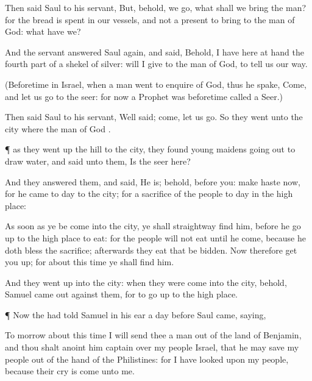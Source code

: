 {Then
said
Saul to his
servant, But, behold,
{} we
go, what shall we
bring the
man? for the
bread is
spent in our
vessels, and
{} not a
present to
bring to the
man of
God: what have we?

And the
servant
answered
Saul
again, and
said, Behold, I
have here at
hand the fourth
part of a
shekel of
silver:
{} will I
give to the
man of
God, to
tell us our
way.

(Beforetime in
Israel, when a
man
went to
enquire of
God, thus he
spake,
Come, and let us
go to the
seer: for
{}
now
{} a
Prophet was
beforetime
called a
Seer.)

Then
said
Saul to his
servant,
Well
said;
come, let us
go. So they
went unto the
city where the
man of
God
{}.


\par }{\PP {}¶
{} as they went
up the
hill to the
city, they
found young
maidens going
out to
draw
water, and
said unto them,
Is the
seer here?

And they
answered them, and
said, He
is; behold,
{}
before you: make
haste now, for he
came to
day to the
city; for
{} a
sacrifice of the
people to
day in the high
place:

As soon as ye be
come into the
city, ye shall
straightway
find him, before he go
up to the high
place to
eat: for the
people will not
eat until he
come, because he doth
bless the
sacrifice;
{}
afterwards they
eat that be
bidden. Now therefore get you
up; for about this
time ye shall
find him.

And they went
up
into the
city:
{} when they were
come into the
city, behold,
Samuel came
out
against them, for to go
up to the high
place.


\par }{\PP {}¶ Now the
{} had
told
Samuel in his
ear
a
day
before
Saul
came,
saying,

To
morrow about this
time I will
send thee a
man out of the
land of
Benjamin, and thou shalt
anoint him
{}
captain over my
people
Israel, that he may
save my
people out of the
hand of the
Philistines: for I have
looked upon my
people, because their
cry is
come unto me.

}
